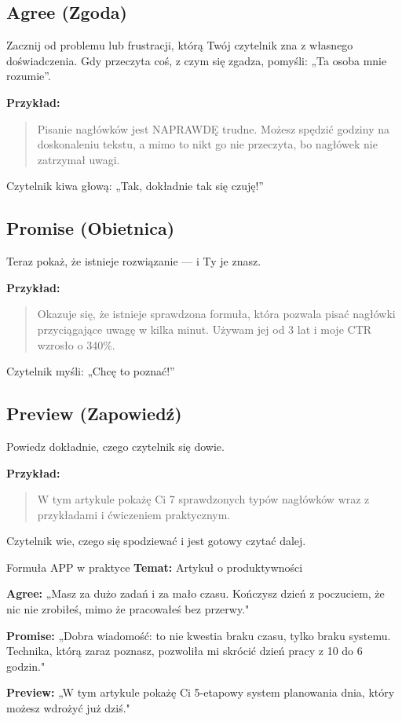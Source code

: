 \documentclass[
  12pt,
  a4paper,
  twoside,
  openright,
  12pt,
  DIV=12,
  BCOR=12mm]{scrbook}
\begin{document}
\subsection{Agree (Zgoda)}\label{agree-zgoda}

Zacznij od problemu lub frustracji, którą Twój czytelnik zna z własnego
doświadczenia. Gdy przeczyta coś, z czym się zgadza, pomyśli: „Ta osoba
mnie rozumie''.

\textbf{Przykład:}

\begin{quote}
Pisanie nagłówków jest NAPRAWDĘ trudne. Możesz spędzić godziny na
doskonaleniu tekstu, a mimo to nikt go nie przeczyta, bo nagłówek nie
zatrzymał uwagi.
\end{quote}

Czytelnik kiwa głową: „Tak, dokładnie tak się czuję!''

\subsection{Promise (Obietnica)}\label{promise-obietnica}

Teraz pokaż, że istnieje rozwiązanie --- i Ty je znasz.

\textbf{Przykład:}

\begin{quote}
Okazuje się, że istnieje sprawdzona formuła, która pozwala pisać
nagłówki przyciągające uwagę w kilka minut. Używam jej od 3 lat i moje
CTR wzrosło o 340\%.
\end{quote}

Czytelnik myśli: „Chcę to poznać!''

\subsection{Preview (Zapowiedź)}\label{preview-zapowiedux17a}

Powiedz dokładnie, czego czytelnik się dowie.

\textbf{Przykład:}

\begin{quote}
W tym artykule pokażę Ci 7 sprawdzonych typów nagłówków wraz z
przykładami i ćwiczeniem praktycznym.
\end{quote}

Czytelnik wie, czego się spodziewać i jest gotowy czytać dalej.

\begin{przyklad}{Formuła APP w praktyce}
\textbf{Temat:} Artykuł o produktywności

\textbf{Agree:} „Masz za dużo zadań i za mało czasu. Kończysz dzień z poczuciem, że nic nie zrobiłeś, mimo że pracowałeś bez przerwy."

\textbf{Promise:} „Dobra wiadomość: to nie kwestia braku czasu, tylko braku systemu. Technika, którą zaraz poznasz, pozwoliła mi skrócić dzień pracy z 10 do 6 godzin."

\textbf{Preview:} „W tym artykule pokażę Ci 5-etapowy system planowania dnia, który możesz wdrożyć już dziś."
\end{przyklad}
\end{document}

